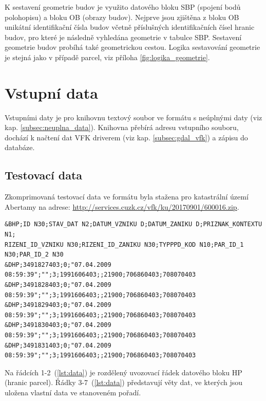 K sestavení geometrie budov je využito datového bloku SBP (spojení
bodů polohopisu) a bloku OB (obrazy budov). Nejprve jsou zjištěna z
bloku OB unikátní identifikační čísla budov včetně příslušných
identifikačních čísel hranic budov, pro které je následně vyhledána
geometrie v tabulce SBP. Sestavení geometrie budov probíhá také
geometrickou cestou. Logika sestavování geometrie je stejná jako v
případě parcel, viz příloha \ref{fig:logika_geometrie}.

\section{Vstupní data}
Vstupními daty je pro knihovnu textový soubor ve formátu  s
neúplnými daty (viz kap. \ref{subsec:neuplna_data}). Knihovna přebírá
adresu vstupního souboru, dochází k načtení dat VFK
driverem (viz kap. \ref{subsec:gdal_vfk}) a zápisu do databáze.

\subsection{Testovací data}
Zkomprimovaná testovací data ve formátu  byla stažena pro
katastrální území Abertamy na adrese:
\href{http://services.cuzk.cz/vfk/ku/20170901/600016.zip}{http://services.cuzk.cz/vfk/ku/20170901/600016.zip}.
     {\scriptsize
\begin{lstlisting}[caption=Ukázka bloku hranic parcel(HP) -- definice bloků a věty dat(zdroj:vlastní), label=lst:data]
&BHP;ID N30;STAV_DAT N2;DATUM_VZNIKU D;DATUM_ZANIKU D;PRIZNAK_KONTEXTU N1;
RIZENI_ID_VZNIKU N30;RIZENI_ID_ZANIKU N30;TYPPPD_KOD N10;PAR_ID_1 N30;PAR_ID_2 N30
&DHP;3491827403;0;"07.04.2009 08:59:39";"";3;1991606403;;21900;706860403;708070403 
&DHP;3491828403;0;"07.04.2009 08:59:39";"";3;1991606403;;21900;706860403;708070403
&DHP;3491829403;0;"07.04.2009 08:59:39";"";3;1991606403;;21900;706860403;708070403
&DHP;3491830403;0;"07.04.2009 08:59:39";"";3;1991606403;;21900;706860403;708070403
&DHP;3491831403;0;"07.04.2009 08:59:39";"";3;1991606403;;21900;706860403;708070403
\end{lstlisting}}
Na řádcích 1-2~(\ref{lst:data}) je rozdělený uvozovací řádek datového
bloku HP (hranic parcel). Řádky 3-7~(\ref{lst:data}) představují věty
dat, ve kterých jsou uložena vlastní data ve stanoveném pořadí.

